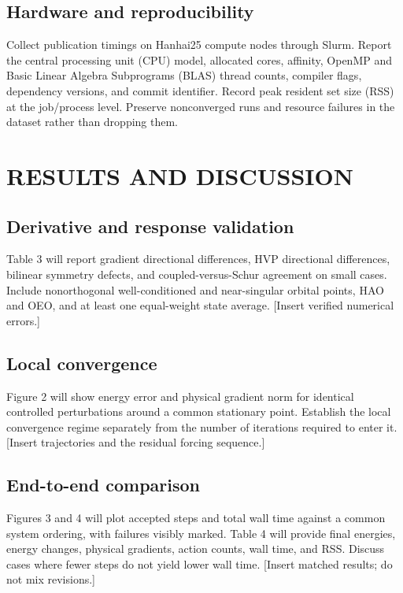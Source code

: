 \documentclass[12pt]{article}
\begin{document}

\subsection{Hardware and reproducibility}

Collect publication timings on Hanhai25 compute nodes through Slurm. Report the central processing unit (CPU) model, allocated cores, affinity, OpenMP and Basic Linear Algebra Subprograms (BLAS) thread counts, compiler flags, dependency versions, and commit identifier. Record peak resident set size (RSS) at the job/process level. Preserve nonconverged runs and resource failures in the dataset rather than dropping them.


\section{RESULTS AND DISCUSSION}

\subsection{Derivative and response validation}

Table 3 will report gradient directional differences, HVP directional differences, bilinear symmetry defects, and coupled-versus-Schur agreement on small cases. Include nonorthogonal well-conditioned and near-singular orbital points, HAO and OEO, and at least one equal-weight state average. [Insert verified numerical errors.]


\subsection{Local convergence}

Figure 2 will show energy error and physical gradient norm for identical controlled perturbations around a common stationary point. Establish the local convergence regime separately from the number of iterations required to enter it. [Insert trajectories and the residual forcing sequence.]


\subsection{End-to-end comparison}

Figures 3 and 4 will plot accepted steps and total wall time against a common system ordering, with failures visibly marked. Table 4 will provide final energies, energy changes, physical gradients, action counts, wall time, and RSS. Discuss cases where fewer steps do not yield lower wall time. [Insert matched results; do not mix revisions.]
\end{document}
